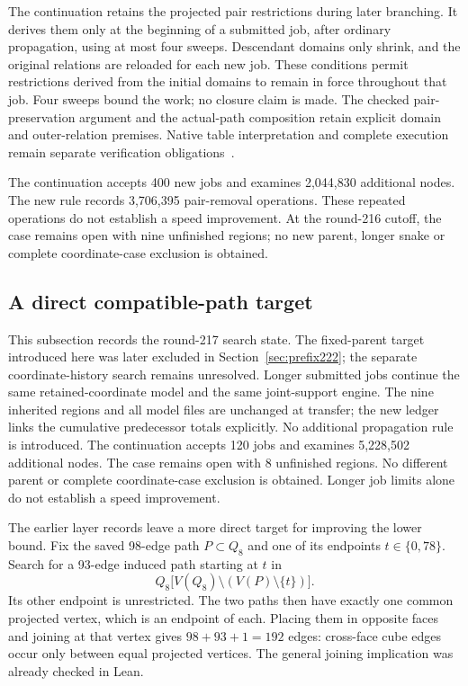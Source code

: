 \documentclass[11pt,a4paper]{article}
\theoremstyle{definition}
\theoremstyle{remark}
\begin{document}
The continuation retains the projected pair restrictions during later
branching. It derives them only at the beginning of a submitted job,
after ordinary propagation, using at most four sweeps. Descendant
domains only shrink, and the original relations are reloaded for each
new job. These conditions permit restrictions derived from the initial
domains to remain in force throughout that job. Four sweeps bound the
work; no closure claim is made. The checked pair-preservation argument
and the actual-path composition retain explicit domain and outer-relation
premises. Native table interpretation and complete execution remain
separate verification obligations~\cite{research216}.

The continuation accepts 400 new jobs and examines 2,044,830 additional nodes. The new rule records 3,706,395 pair-removal operations. These repeated operations do not establish a speed improvement. At the round-216 cutoff, the case remains open with nine unfinished regions; no new parent, longer snake or complete coordinate-case exclusion is obtained.


\subsection{A direct compatible-path target}
\label{sec:direct217}
This subsection records the round-217 search state. The fixed-parent
target introduced here was later excluded in Section~\ref{sec:prefix222};
the separate coordinate-history search remains unresolved.
Longer submitted jobs continue the same retained-coordinate model and
the same joint-support engine. The nine inherited regions and all model
files are unchanged at transfer; the new ledger links the cumulative
predecessor totals explicitly. No additional propagation rule is introduced.
The continuation accepts 120 jobs and examines 5,228,502 additional nodes. The case remains open with 8 unfinished regions. No different parent or complete coordinate-case exclusion is obtained. Longer job limits alone do not establish a speed improvement.


The earlier layer records leave a more direct target for improving the
lower bound. Fix the saved 98-edge path $P\subset Q_8$ and one of its
endpoints $t\in\{0,78\}$. Search for a 93-edge induced path starting at
$t$ in
\[
Q_8\bigl[V(Q_8)\setminus(V(P)\setminus\{t\})\bigr].
\]
Its other endpoint is unrestricted. The two paths then have exactly one
common projected vertex, which is an endpoint of each. Placing them in
opposite faces and joining at that vertex gives $98+93+1=192$ edges:
cross-face cube edges occur only between equal projected vertices.
The general joining implication was already checked in Lean.
\end{document}
